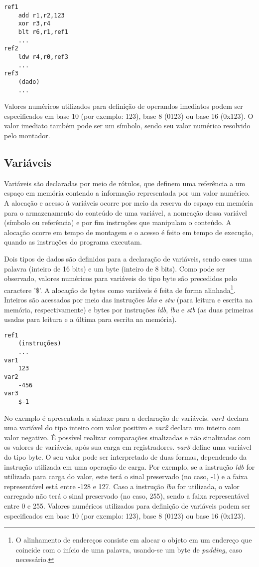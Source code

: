 \documentclass[11pt,a4paper]{report}
\begin{document}
\begin{verbatim}
ref1
    add r1,r2,123
    xor r3,r4
    blt r6,r1,ref1
    ...
ref2
    ldw r4,r0,ref3
    ...
ref3
    (dado)
    ...
\end{verbatim}

Valores numéricos utilizados para definição de operandos imediatos podem
ser especificados em base 10 (por exemplo: 123), base 8 (0123) ou base
16 (0x123). O valor imediato também pode ser um símbolo, sendo seu valor
numérico resolvido pelo montador.

\subsection{Variáveis}

Variáveis são declaradas por meio de rótulos, que definem uma referência
a um espaço em memória contendo a informação representada por um valor
numérico. A alocação e acesso à variáveis ocorre por meio da reserva
do espaço em memória para o armazenamento do conteúdo de uma variável,
a nomeação dessa variável (símbolo ou referência) e por fim instruções
que manipulam o conteúdo. A alocação ocorre em tempo de montagem e o
acesso é feito em tempo de execução, quando as instruções do programa
executam.

Dois tipos de dados são definidos para a declaração de variáveis, sendo
esses uma palavra (inteiro de 16 bits) e um byte (inteiro de 8 bits).
Como pode ser observado, valores numéricos para variáveis do tipo byte
são precedidos pelo caractere '\$'. A alocação de bytes como variáveis
é feita de forma alinhada\footnote{O alinhamento de endereços consiste
em alocar o objeto em um endereço que coincide com o início de uma
palavra, usando-se um byte de \textit{padding}, caso necessário.}.
Inteiros são acessados por meio das instruções \textit{ldw} e \textit{stw}
(para leitura e escrita na memória, respectivamente) e bytes por
instruções \textit{ldb}, \textit{lbu} e \textit{stb} (as duas primeiras
usadas para leitura e a última para escrita na memória).

\begin{verbatim}
ref1
    (instruções)
    ...
var1
    123
var2
    -456
var3
    $-1
\end{verbatim}

No exemplo é apresentada a sintaxe para a declaração de variáveis.
\textit{var1} declara uma variável do tipo inteiro com valor positivo e
\textit{var2} declara um inteiro com valor negativo. É possível realizar
comparações sinalizadas e não sinalizadas com os valores de variáveis,
após sua carga em registradores. \textit{var3} define uma variável do
tipo byte. O seu valor pode ser interpretado de duas formas, dependendo
da instrução utilizada em uma operação de carga. Por exemplo, se a 
instrução \textit{ldb} for utilizada para carga do valor, este
terá o sinal preservado (no caso, -1) e a faixa representável está entre
-128 e 127. Caso a instrução \textit{lbu} for utilizada, o valor carregado
não terá o sinal preservado (no caso, 255), sendo a faixa representável
entre 0 e 255. Valores numéricos utilizados para definição de variáveis
podem ser especificados em base 10 (por exemplo: 123), base 8 (0123) ou
base 16 (0x123).
\end{document}
